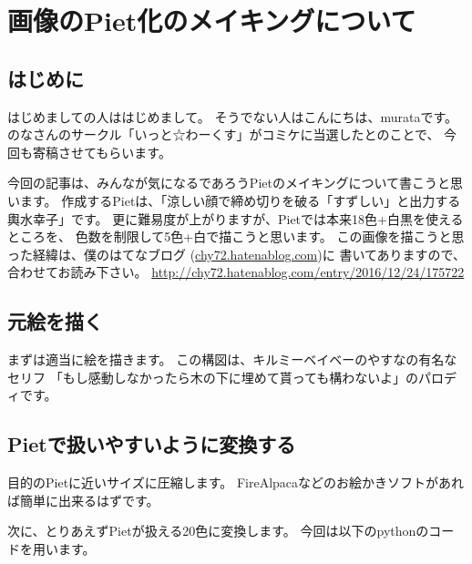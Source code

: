 \chapter[画像のPiet化のメイキングについて]{画像のPiet化のメイキングについて}

\author{murata}

\section{はじめに}

はじめましての人ははじめまして。 そうでない人はこんにちは、murataです。
のなさんのサークル「いっと☆わーくす」がコミケに当選したとのことで、
今回も寄稿させてもらいます。

今回の記事は、みんなが気になるであろうPietのメイキングについて書こうと思います。
作成するPietは、「涼しい顔で締め切りを破る「すずしい」と出力する輿水幸子」です。
更に難易度が上がりますが、Pietでは本来18色+白黒を使えるところを、
色数を制限して5色+白で描こうと思います。
この画像を描こうと思った経緯は、僕のはてなブログ
(\url{chy72.hatenablog.com})に 書いてありますので、合わせてお読み下さい。
\url{http://chy72.hatenablog.com/entry/2016/12/24/175722}

\section{元絵を描く}


まずは適当に絵を描きます。
この構図は、キルミーベイベーのやすなの有名なセリフ
「もし感動しなかったら木の下に埋めて貰っても構わないよ」のパロディです。

\section{Pietで扱いやすいように変換する}

目的のPietに近いサイズに圧縮します。
FireAlpacaなどのお絵かきソフトがあれば簡単に出来るはずです。


次に、とりあえずPietが扱える20色に変換します。
今回は以下のpythonのコードを用います。

